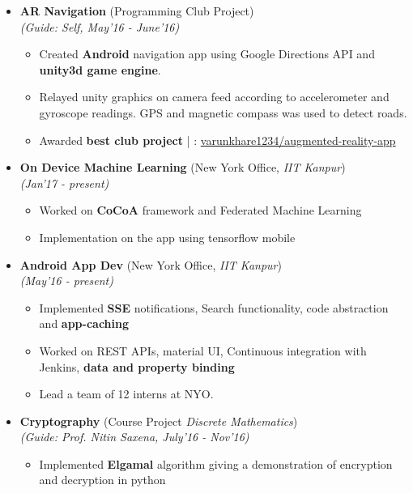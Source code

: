 \documentclass[a4paper,10pt]{article}
\newcommand{\isep}{-2 pt}
\begin{document}
\begin{itemize}
\item \textbf{AR Navigation} (Programming Club Project) \\
 \emph{(Guide: Self, May'16 - June'16)} \\[-0.6cm]
	\begin{itemize}\itemsep \isep
	\item Created \textbf{Android} navigation app using Google Directions API and \textbf{unity3d game engine}.
	\item Relayed unity graphics on camera feed according to accelerometer and gyroscope readings. GPS and magnetic compass was used to detect roads.
	\item Awarded \textbf{best club project} | \faGithub : \href{https://github.com/varunkhare1234/augmented-reality-app}{varunkhare1234/augmented-reality-app}
	\end{itemize}
\item \textbf{On Device Machine Learning} (New York Office, \textit{IIT Kanpur}) \\
 \emph{(Jan'17 - present)} \\[-0.6cm]
	\begin{itemize}\itemsep \isep
	\item Worked on \textbf{CoCoA} framework and Federated Machine Learning 
	\item Implementation on the app using tensorflow mobile
	\end{itemize}
\item \textbf{Android App Dev} (New York Office, \textit{IIT Kanpur}) \\
 \emph{(May'16 - present)} \\[-0.6cm]
	\begin{itemize}\itemsep \isep
	\item Implemented \textbf{SSE} notifications, Search functionality, code abstraction and \textbf{app-caching}
	\item Worked on REST APIs, material UI, Continuous integration with Jenkins, \textbf{data and property binding} 
	\item Lead a team of 12 interns at NYO.
	\end{itemize}
\item \textbf{Cryptography} (Course Project \textit{Discrete Mathematics}) \\
 \emph{(Guide: Prof. Nitin Saxena, July'16 - Nov'16)} \\[-0.6cm]
	\begin{itemize}\itemsep \isep
	\item Implemented \textbf{Elgamal} algorithm giving a demonstration of encryption and decryption in python

\end{itemize}
\end{itemize}
\end{document}
